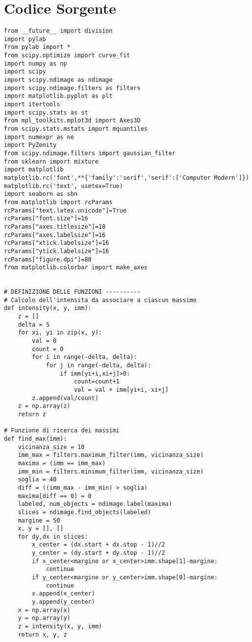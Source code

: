 \clearpage{\pagestyle{empty}\cleardoublepage}
\chapter{Codice Sorgente} 
\label{appendiceWSS} 

\lstset{language=Python, numbers=left, stepnumber=1, breaklines=true}

\begin{lstlisting}
from __future__ import division
import pylab
from pylab import *
from scipy.optimize import curve_fit
import numpy as np
import scipy
import scipy.ndimage as ndimage
import scipy.ndimage.filters as filters
import matplotlib.pyplot as plt
import itertools
import scipy.stats as st
from mpl_toolkits.mplot3d import Axes3D
from scipy.stats.mstats import mquantiles
import numexpr as ne
import PyZenity
from scipy.ndimage.filters import gaussian_filter
from sklearn import mixture
import matplotlib
matplotlib.rc('font',**{'family':'serif','serif':['Computer Modern']})
matplotlib.rc('text', usetex=True)
import seaborn as sbn
from matplotlib import rcParams
rcParams["text.latex.unicode"]=True
rcParams["font.size"]=16
rcParams["axes.titlesize"]=18
rcParams["axes.labelsize"]=16
rcParams["xtick.labelsize"]=16
rcParams["ytick.labelsize"]=16
rcParams["figure.dpi"]=80
from matplotlib.colorbar import make_axes


# DEFINIZIONE DELLE FUNZIONI ----------
# Calcolo dell'intensita da associare a ciascun massimo 
def intensity(x, y, imm):
    z = []    
    delta = 5
    for xi, yi in zip(x, y):
        val = 0
        count = 0
        for i in range(-delta, delta):
            for j in range(-delta, delta):
                if imm[yi+i,xi+j]>0:
                    count=count+1
                    val = val + imm[yi+i, xi+j]
        z.append(val/count)  
    z = np.array(z)
    return z
        
# Funzione di ricerca dei massimi 
def find_max(imm):
    vicinanza_size = 10
    imm_max = filters.maximum_filter(imm, vicinanza_size)
    maxima = (imm == imm_max)
    imm_min = filters.minimum_filter(imm, vicinanza_size)
    soglia = 40
    diff = ((imm_max - imm_min) > soglia)
    maxima[diff == 0] = 0
    labeled, num_objects = ndimage.label(maxima)
    slices = ndimage.find_objects(labeled)
    margine = 50
    x, y = [], []
    for dy,dx in slices:
        x_center = (dx.start + dx.stop - 1)//2
        y_center = (dy.start + dy.stop - 1)//2 
        if x_center<margine or x_center>imm.shape[1]-margine:
            continue                                         
        if y_center<margine or y_center>imm.shape[0]-margine:
            continue
        x.append(x_center)
        y.append(y_center)
    x = np.array(x)
    y = np.array(y)
    z = intensity(x, y, imm)
    return x, y, z


\end{lstlisting}
